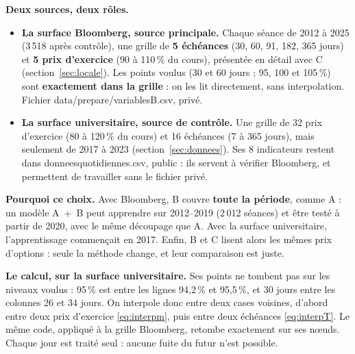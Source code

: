 \documentclass[10pt,a4paper]{article}
\newcommand{\coupure}{\textunderscore\allowbreak}
\newcommand{\fic}[1]{{\small\ttfamily\let\_\coupure #1}}
\begin{document}
\textbf{Deux sources, deux rôles.}
\begin{itemize}[nosep,leftmargin=*]
  \item \textbf{La surface Bloomberg, source principale.} Chaque séance de 2012 à 2025 (3\,518 après contrôle), une grille de \textbf{5 échéances} (30, 60, 91, 182, 365 jours) et \textbf{5 prix d'exercice} (90 à 110\,\% du cours), présentée en détail avec C (section~\ref{sec:locale}). Les points voulus (30 et 60 jours ; 95, 100 et 105\,\%) sont \textbf{exactement dans la grille} : on les lit directement, sans interpolation. Fichier \fic{data/prepare/variables\_B.csv}, privé.
  \item \textbf{La surface universitaire, source de contrôle.} Une grille de 32 prix d'exercice (80 à 120\,\% du cours) et 16 échéances (7 à 365 jours), mais seulement de 2017 à 2023 (section~\ref{sec:donnees}). Ses 8 indicateurs restent dans \fic{donnees\_quotidiennes.csv}, public : ils servent à vérifier Bloomberg, et permettent de travailler sans le fichier privé.
\end{itemize}
\textbf{Pourquoi ce choix.} Avec Bloomberg, B couvre \textbf{toute la période}, comme A : un modèle A~+~B peut apprendre sur 2012–2019 (2\,012 séances) et être testé à partir de 2020, avec le même découpage que A. Avec la surface universitaire, l'apprentissage commençait en 2017. Enfin, B et C lisent alors les mêmes prix d'options : seule la méthode change, et leur comparaison est juste.

\textbf{Le calcul, sur la surface universitaire.} Ses points ne tombent pas sur les niveaux voulus : 95\,\% est entre les lignes 94,2\,\% et 95,5\,\%, et 30 jours entre les colonnes 26 et 34 jours. On interpole donc entre deux cases voisines, d'abord entre deux prix d'exercice \eqref{eq:interpm}, puis entre deux échéances \eqref{eq:interpT}. Le même code, appliqué à la grille Bloomberg, retombe exactement sur ses nœuds. Chaque jour est traité seul : aucune fuite du futur n'est possible.
\end{document}
